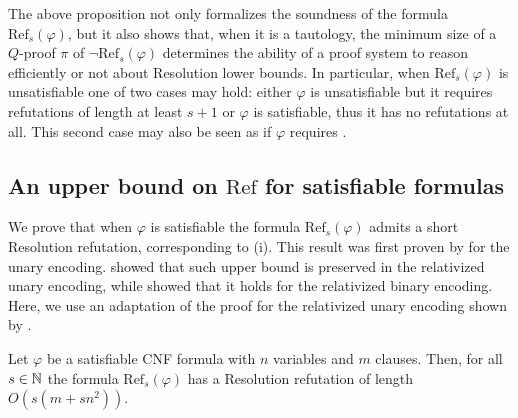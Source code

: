 The above proposition not only formalizes the soundness of the formula $\mathrm{Ref}_s(\varphi)$, but it also shows that, when it is a tautology, the minimum size of a $Q$-proof $\pi$ of $\lnot \mathrm{Ref}_s(\varphi)$ determines the ability of a proof system to reason efficiently or not about Resolution lower bounds. In particular, when $\mathrm{Ref}_s(\varphi)$ is unsatisfiable one of two cases may hold: either $\varphi$ is unsatisfiable but it requires refutations of length at least $s+1$ or $\varphi$ is satisfiable, thus it has no refutations at all. This second case may also be seen as if $\varphi$ requires .

\subsection{An upper bound on $\mathrm{Ref}$ for satisfiable formulas}
\label{sec:pudlak_upper}

We prove that when $\varphi$ is satisfiable the formula $\mathrm{Ref}_s(\varphi)$ admits a short Resolution refutation, corresponding to (i). This result was first proven by \textcite{pudlak_upper} for the unary encoding. \textcite{res_nphard} showed that such upper bound is preserved in the relativized unary encoding, while  \textcite{alg_nphard} showed that it holds for the relativized binary encoding. Here, we use an adaptation of the proof for the relativized unary encoding shown by \textcite{pap}.

\begin{lemma}
    Let $\varphi$ be a satisfiable CNF formula with $n$ variables and $m$ clauses. Then, for all $s \in \mathbb{N}$ the formula $\mathrm{Ref}_s(\varphi)$ has a Resolution refutation of length $O(s(m+sn^2))$.
    \label{lem:pudlak_upper_bound}
\end{lemma}

